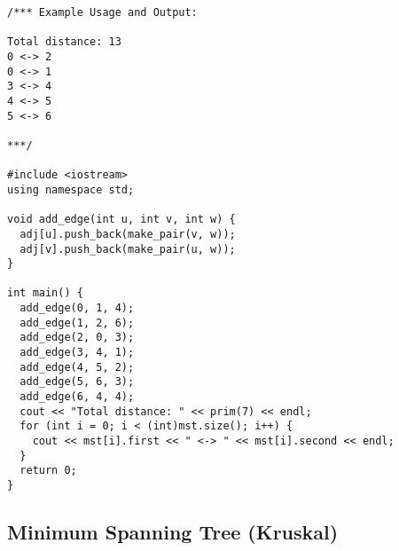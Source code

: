 \begin{lstlisting}
/*** Example Usage and Output:

Total distance: 13
0 <-> 2
0 <-> 1
3 <-> 4
4 <-> 5
5 <-> 6

***/

#include <iostream>
using namespace std;

void add_edge(int u, int v, int w) {
  adj[u].push_back(make_pair(v, w));
  adj[v].push_back(make_pair(u, w));
}

int main() {
  add_edge(0, 1, 4);
  add_edge(1, 2, 6);
  add_edge(2, 0, 3);
  add_edge(3, 4, 1);
  add_edge(4, 5, 2);
  add_edge(5, 6, 3);
  add_edge(6, 4, 4);
  cout << "Total distance: " << prim(7) << endl;
  for (int i = 0; i < (int)mst.size(); i++) {
    cout << mst[i].first << " <-> " << mst[i].second << endl;
  }
  return 0;
}
\end{lstlisting}
\subsection{Minimum Spanning Tree (Kruskal)}
